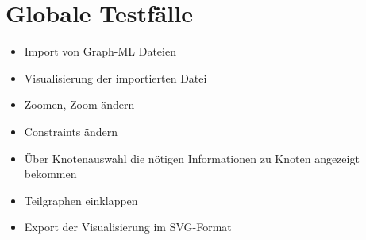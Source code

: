 \chapter{Globale Testfälle}

\begin{itemize}
	\item Import von Graph-ML Dateien
	\item Visualisierung der importierten Datei
	\item Zoomen, Zoom ändern
	\item Constraints ändern
	\item Über Knotenauswahl die nötigen Informationen zu Knoten angezeigt bekommen
	\item Teilgraphen einklappen
	\item Export der Visualisierung im SVG-Format
\end{itemize}